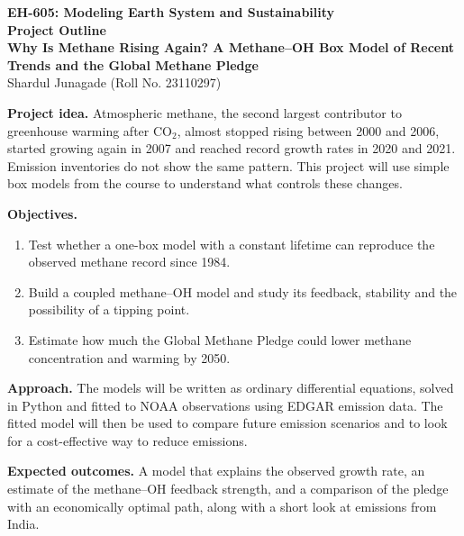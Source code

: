 \documentclass[11pt,a4paper]{article}
\begin{document}
\begin{center}
{\large\bfseries EH-605: Modeling Earth System and Sustainability\\[2pt] Project Outline}\\[12pt]
{\Large\bfseries Why Is Methane Rising Again? A Methane--OH Box Model of Recent Trends and the Global Methane Pledge}\\[10pt]
Shardul Junagade \quad (Roll No. 23110297)
\end{center}

\vspace{6pt}

\textbf{Project idea.}
Atmospheric methane, the second largest contributor to greenhouse warming after CO$_2$, almost stopped rising between 2000 and 2006, started growing again in 2007 and reached record growth rates in 2020 and 2021. Emission inventories do not show the same pattern. This project will use simple box models from the course to understand what controls these changes.

\textbf{Objectives.}
\begin{enumerate}
\item Test whether a one-box model with a constant lifetime can reproduce the observed methane record since 1984.
\item Build a coupled methane--OH model and study its feedback, stability and the possibility of a tipping point.
\item Estimate how much the Global Methane Pledge could lower methane concentration and warming by 2050.
\end{enumerate}

\textbf{Approach.}
The models will be written as ordinary differential equations, solved in Python and fitted to NOAA observations using EDGAR emission data. The fitted model will then be used to compare future emission scenarios and to look for a cost-effective way to reduce emissions.

\textbf{Expected outcomes.}
A model that explains the observed growth rate, an estimate of the methane--OH feedback strength, and a comparison of the pledge with an economically optimal path, along with a short look at emissions from India.
\end{document}
